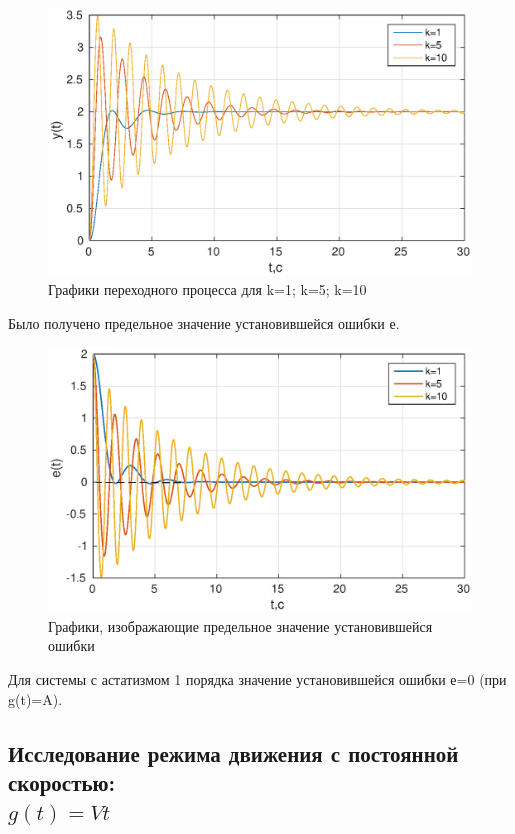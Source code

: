 \documentclass[12pt,a4paper]{article}
\begin{document}
\begin{figure}[H]
\centering
\includegraphics[width=\textwidth]{1/2_1y(t).eps}
\caption{Графики переходного процесса для k=1; k=5; k=10}
\end{figure}
Было получено предельное значение установившейся ошибки е.

\begin{figure}[H]
\centering
\includegraphics[width=\textwidth]{1/2_1e(t).eps}
\caption{Графики, изображающие предельное значение установившейся ошибки}
\end{figure}

Для системы с астатизмом 1 порядка значение установившейся ошибки е=0 (при g(t)=A).

\subsection{Исследование режима движения с постоянной скоростью: \\$g(t)=Vt$}
\end{document}
